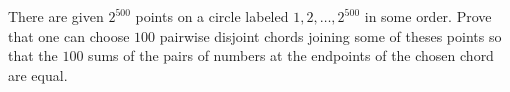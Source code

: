 There are given 
$2^{500}$
 points on a circle labeled 
$1,2,\ldots ,2^{500}$
 in some order. Prove that one can choose 
$100$
 pairwise disjoint chords joining some of theses points so that the 
$100$
 sums of the pairs of numbers at the endpoints of the chosen chord are equal.
